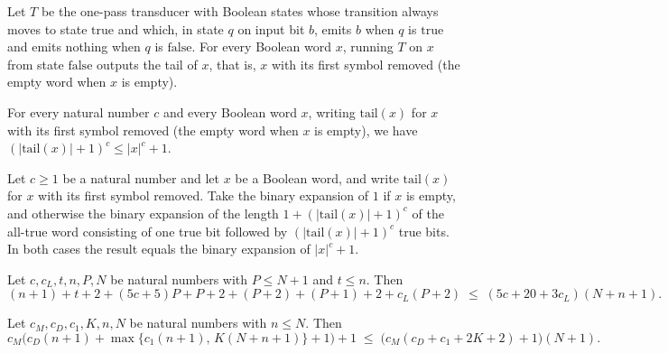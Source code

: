 \begin{theorem}
\label{Complexity.scp_transduce_tail}
\leanok
{}
Let $T$ be the one-pass transducer with Boolean states whose transition always moves to
state $\mathrm{true}$ and which, in state $q$ on input bit $b$, emits $b$ when $q$ is
$\mathrm{true}$ and emits nothing when $q$ is $\mathrm{false}$. For every Boolean word
$x$, running $T$ on $x$ from state $\mathrm{false}$ outputs the tail of $x$, that is,
$x$ with its first symbol removed (the empty word when $x$ is empty).
\end{theorem}

\begin{theorem}
\label{Complexity.scp_tail_pow_le}
\leanok
{}
For every natural number $c$ and every Boolean word $x$, writing $\mathrm{tail}(x)$ for
$x$ with its first symbol removed (the empty word when $x$ is empty), we have
$(|\mathrm{tail}(x)|+1)^c\le |x|^c+1$.
\end{theorem}

\begin{theorem}
\label{Complexity.scp_value}
\leanok
{}
Let $c\ge 1$ be a natural number and let $x$ be a Boolean word, and write
$\mathrm{tail}(x)$ for $x$ with its first symbol removed. Take the binary expansion of
$1$ if $x$ is empty, and otherwise the binary expansion of the length
$1+(|\mathrm{tail}(x)|+1)^c$ of the all-true word consisting of one true bit followed by
$(|\mathrm{tail}(x)|+1)^c$ true bits. In both cases the result equals the binary
expansion of $|x|^c+1$.
\end{theorem}

\begin{theorem}
\label{Complexity.scp_time_arith}
\leanok
{}
Let $c,c_L,t,n,P,N$ be natural numbers with $P\le N+1$ and $t\le n$. Then
\[
  (n+1)+t+2+(5c+5)P+P+2+(P+2)+(P+1)+2+c_L(P+2)\;\le\;(5c+20+3c_L)(N+n+1).
\]
\end{theorem}

\begin{theorem}
\label{Complexity.scp_space_arith}
\leanok
{}
Let $c_M,c_D,c_1,K,n,N$ be natural numbers with $n\le N$. Then
\[
  c_M\bigl(c_D(n+1)+\max\{c_1(n+1),\,K(N+n+1)\}+1\bigr)+1
  \;\le\;\bigl(c_M(c_D+c_1+2K+2)+1\bigr)(N+1).
\]
\end{theorem}

